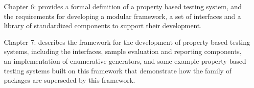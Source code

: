 Chapter 6: provides a formal definition of a property based testing system,
and the requirements for developing a modular framework,
a set of interfaces and a library of standardized components
to support their development.

Chapter 7: describes the \GC framework for the development of property based testing systems,
including the interfaces, sample evaluation and reporting components,
an implementation of enumerative generators,
and some example property based testing systems
built on this framework that demonstrate how 
the \QC family of packages are superseded by this framework.

